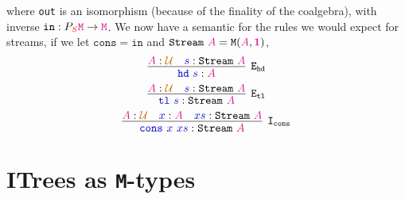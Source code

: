 \documentclass[twoside,11pt,openright]{report}
\newcommand*{\term}[1]{\textcolor{blue!80!black}{#1}}
\newcommand*{\type}[1]{\textcolor{magenta!90!black}{#1}}
\newcommand*{\container}[1]{\textcolor{red}{#1}}
\newcommand*{\universe}[1]{\textcolor{orange!80!black}{#1}}
\newcommand*{\unit}{\type{\textbf{1}}}
\begin{document}
where \texttt{out} is an isomorphism (because of the finality of the coalgebra), with inverse \(\mathtt{in} : P_{\container{S}}\type{\mathtt{M}} \rightarrow \type{\mathtt{M}}\). We now have a semantic for the rules we would expect for streams, if we let \(\mathtt{cons} = \mathtt{in}\) and \(\mathtt{Stream}~\type{A} = \mathtt{M}(\type{A},\unit)\),
\begin{equation}
  \infer[\mathtt{E}_{\mathtt{hd}}]{\term{\mathtt{hd}}~\term{s} : \type{A}}{\type{A} : \universe{\mathcal{U}} & \term{s} : \mathtt{Stream}~\type{A}}
\end{equation}
\begin{equation}
  \infer[\mathtt{E}_{\mathtt{tl}}]{\term{\mathtt{tl}}~\term{s} : \mathtt{Stream}~\type{A}}{\type{A} : \universe{\mathcal{U}} & \term{s} : \mathtt{Stream}~\type{A}}
\end{equation}
\begin{equation}
  \infer[\mathtt{I}_{\mathtt{cons}}]{\term{\mathtt{cons}}~\term{x}~\term{xs} : \mathtt{Stream}~\type{A}}{\type{A} : \universe{\mathcal{U}} & \term{x} : \type{A} & \term{xs} : \mathtt{Stream}~\type{A}}
\end{equation}

\section{ITrees as \texttt{M}-types}
\end{document}
